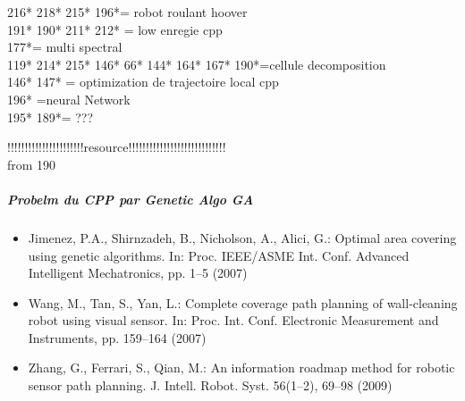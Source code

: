 	216* 218* 215* 196*= robot roulant hoover \\
	
	191* 190* 211* 212* = low enregie cpp\\
	177*= multi spectral\\
	119* 214* 215* 146* 66* 144* 164* 167* 190*=cellule decomposition \\
	146* 147* = optimization de trajectoire local cpp\\
	196* =neural Network \\
	195* 189*= ???

	
	
	!!!!!!!!!!!!!!!!!!!!!!resource!!!!!!!!!!!!!!!!!!!!!!!!!!!!\\ 
	from 190

\subparagraph{Probelm du CPP par Genetic Algo GA }	
\begin{itemize}
	\item Jimenez, P.A., Shirnzadeh, B., Nicholson, A., Alici, G.: Optimal area covering using genetic algorithms. In: Proc. IEEE/ASME Int. Conf. Advanced Intelligent Mechatronics, pp. 1–5 (2007)
	
	\item Wang, M., Tan, S., Yan, L.: Complete coverage path planning of wall-cleaning robot using visual sensor. In: Proc. Int. Conf. Electronic Measurement and
Instruments, pp. 159–164 (2007)

	\item Zhang, G., Ferrari, S., Qian, M.: An information
roadmap method for robotic sensor path planning. J. Intell. Robot. Syst. 56(1–2), 69–98 (2009)
	\end{itemize}


